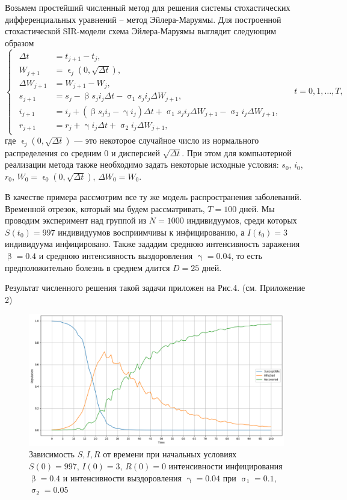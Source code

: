 \documentclass[a4paper, 12pt]{extarticle}
\numberwithin{equation}{section}
\renewcommand{\beta}{\upbeta}
\renewcommand{\gamma}{\upgamma}
\renewcommand{\sigma}{\upsigma}
\renewcommand{\epsilon}{\upvarepsilon}
\begin{document}
	Возьмем простейший численный метод для решения системы стохастических дифференциальных уравнений -- метод Эйлера-Маруямы. Для построенной стохастической SIR-модели схема Эйлера-Маруямы выглядит следующим образом
	\begin{equation}
		\left\{ 
		\begin{gathered} 
			\begin{aligned}
				\Delta t &= t_{j+1} - t_j,\\
				W_{j+1} &= \epsilon_j(0, \sqrt{\Delta t}),\\
				\Delta W_{j+1} &= W_{j+1} - W_j,\\
				s_{j+1} &= s_j - \beta s_j i_j \Delta t - \sigma_1 s_j i_j \Delta W_{j+1},\\
				i_{j+1} &= i_j + (\beta s_j i_j - \gamma i_j)\Delta t + \sigma_1 s_j i_j \Delta W_{j+1} - \sigma_2 i_j \Delta W_{j+1},\\
				r_{j+1} &= r_j + \gamma i_j\Delta t + \sigma_2 i_j \Delta W_{j+1},
			\end{aligned}
		\end{gathered} 
		\right.\quad t=0, 1,\ldots, T,		
	\end{equation}
	где $\epsilon_j(0, \sqrt{\Delta t})$ --- это некоторое случайное число из нормального распределения со средним $0$ и дисперсией $\sqrt{\Delta t}$.
	При этом для компьютерной реализации метода также необходимо задать некоторые исходные условия: $s_0$, $i_0$, $r_0$, $W_0 = \epsilon_0(0, \sqrt{\Delta t})$, $\Delta W_0  = W_0$.
	
	В качестве примера рассмотрим все ту же модель распространения заболеваний. Временной отрезок, который мы будем рассматривать, $T = 100$ дней. Мы проводим эксперимент над группой из $N=1000$ индивидуумов, среди которых $S(t_0) = 997$ индивидуумов восприимчивы к инфицированию, а $I(t_0) = 3$ индивидуума инфицировано. Также зададим среднюю интенсивность заражения $\beta = 0.4$ и среднюю интенсивность выздоровления $\gamma = 0.04$, то есть предположительно болезнь в среднем длится $D = 25$ дней.
	
	Результат численного решения такой задачи приложен на Рис.4. (см. Приложение 2)
	\begin{figure}[h]
		\centering
		\includegraphics[scale=0.45]{images/img04}
		\caption{Зависимость $S, I, R$ от времени при начальных условиях $S(0) = 997$, $I(0) = 3$, $R(0) = 0$
			интенсивности инфицирования $\beta = 0.4$ и интенсивности выздоровления $\gamma = 0.04$ при $\sigma_1 = 0.1$, $\sigma_2 = 0.05$}
		\label{fig:img04}
	\end{figure}
	
\end{document}
